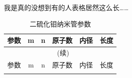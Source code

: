 \documentclass[AutoFakeBold]{LZUThesis}
\begin{document}
我是真的没想到有的人表格居然这么长……

\begin{longtable}{cccccc}
    \caption{二硫化钼纳米管参数}\label{tbl_mos2_nanotube2} \\
    \toprule
    参数   & m  & n  & 原子数  & 内径       & 长度         \\
    \midrule
    \endfirsthead  %
    
    \multicolumn{6}{c}{\tablename\ \thetable{} (续)}\\
    \toprule
    参数   & m  & n  & 原子数  & 内径       & 长度         \\
    \midrule
    \endhead  %
    
    \midrule
    \endfoot  %
    
    \bottomrule
    \endlastfoot  %


\end{longtable}
\end{document}
